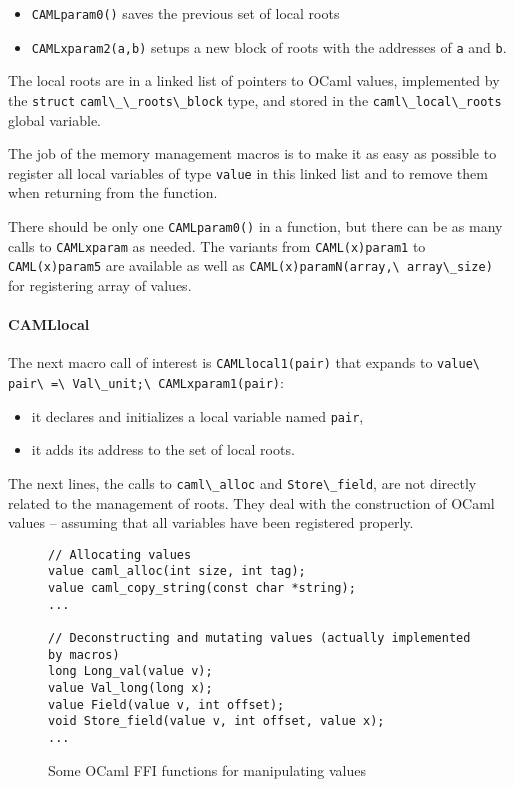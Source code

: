 \documentclass[a4paper]{easychair}
\newcommand{\cpp}[1]{\lstinline[style=C++]{#1}}
\begin{document}
\begin{itemize}
  \item \cpp{CAMLparam0()} saves the previous set of local roots 
  \item \cpp{CAMLxparam2(a,b)} setups a new block of roots with the
      addresses of \cpp{a} and \cpp{b}.
\end{itemize}

The local roots are in a linked list of pointers to OCaml values,
implemented by the \cpp{struct} \cpp{caml\_\_roots\_block} type, and
stored in the \cpp{caml\_local\_roots} global variable.

The job of the memory management macros is to make it as easy as
possible to register all local variables of type \cpp{value} in this
linked list and to remove them when returning from the function.

There should be only one \cpp{CAMLparam0()} in a function, but there
can be as many calls to \cpp{CAMLxparam} as needed. The variants from
\cpp{CAML(x)param1} to \cpp{CAML(x)param5} are available as well as
\cpp{CAML(x)paramN(array,\ array\_size)} for registering array of values.

\paragraph{CAMLlocal} The next macro call of interest is
\cpp{CAMLlocal1(pair)} that expands to
\cpp{value\ pair\ =\ Val\_unit;\ CAMLxparam1(pair)}:
%
\begin{itemize}
\item it declares and initializes a local variable named \cpp{pair},
\item it adds its address to the set of local roots.
\end{itemize}

The next lines, the calls to \cpp{caml\_alloc} and
\cpp{Store\_field}, are not directly related to the management of
roots. They deal with the construction of OCaml values -- assuming that
all variables have been registered properly.

\begin{figure}[htbp]
\begin{lstlisting}[style=C++]
// Allocating values
value caml_alloc(int size, int tag);
value caml_copy_string(const char *string);
...
    
// Deconstructing and mutating values (actually implemented by macros)
long Long_val(value v);
value Val_long(long x);
value Field(value v, int offset); 
void Store_field(value v, int offset, value x);
...
\end{lstlisting}
  \caption{Some OCaml FFI functions for manipulating values}
  \label{fig:mlvalue}
\end{figure}
\end{document}
